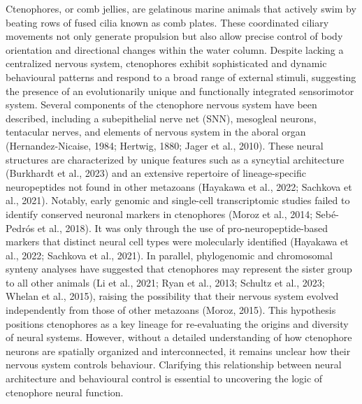 \documentclass[
  11pt,
]{article}
\begin{document}
Ctenophores, or comb jellies, are gelatinous marine animals that
actively swim by beating rows of fused cilia known as comb plates. These
coordinated ciliary movements not only generate propulsion but also
allow precise control of body orientation and directional changes within
the water column. Despite lacking a centralized nervous system,
ctenophores exhibit sophisticated and dynamic behavioural patterns and
respond to a broad range of external stimuli, suggesting the presence of
an evolutionarily unique and functionally integrated sensorimotor
system. Several components of the ctenophore nervous system have been
described, including a subepithelial nerve net (SNN), mesogleal neurons,
tentacular nerves, and elements of nervous system in the aboral organ
(Hernandez-Nicaise, 1984; Hertwig, 1880; Jager et al., 2010). These
neural structures are characterized by unique features such as a
syncytial architecture (Burkhardt et al., 2023) and an extensive
repertoire of lineage-specific neuropeptides not found in other
metazoans (Hayakawa et al., 2022; Sachkova et al., 2021). Notably, early
genomic and single-cell transcriptomic studies failed to identify
conserved neuronal markers in ctenophores (Moroz et al., 2014;
Sebé-Pedrós et al., 2018). It was only through the use of
pro-neuropeptide-based markers that distinct neural cell types were
molecularly identified (Hayakawa et al., 2022; Sachkova et al., 2021).
In parallel, phylogenomic and chromosomal synteny analyses have
suggested that ctenophores may represent the sister group to all other
animals (Li et al., 2021; Ryan et al., 2013; Schultz et al., 2023;
Whelan et al., 2015), raising the possibility that their nervous system
evolved independently from those of other metazoans (Moroz, 2015). This
hypothesis positions ctenophores as a key lineage for re-evaluating the
origins and diversity of neural systems. However, without a detailed
understanding of how ctenophore neurons are spatially organized and
interconnected, it remains unclear how their nervous system controls
behaviour. Clarifying this relationship between neural architecture and
behavioural control is essential to uncovering the logic of ctenophore
neural function.
\end{document}

